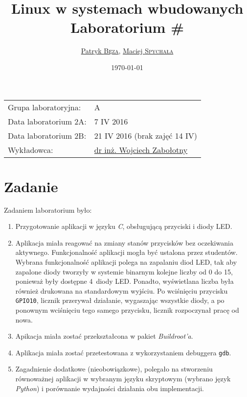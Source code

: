 \documentclass{article}
\title{Linux w systemach wbudowanych\\Laboratorium \#\labnumber}
\author{\href{mailto:bezap@student.mini.pw.edu.pl}{Patryk \textsc{Bęza}}, \href{mailto:spychalam@student.mini.pw.edu.pl}{Maciej \textsc{Spychała}}}
\date{\today}
\newcommand{\labnumber}{2}
\begin{document}
\maketitle

\begin{center}
\begin{tabular}{ll}
Grupa laboratoryjna: & A\\
Data laboratorium \labnumber A: & 7 IV 2016\\
Data laboratorium \labnumber B: & 21 IV 2016 (brak zajęć 14 IV)\\
Wykładowca: & \href{mailto:wzab@ise.pw.edu.pl}{dr inż. Wojciech Zabołotny}
\end{tabular}
\end{center}



\section{Zadanie}
\label{task}

Zadaniem laboratorium było:
\begin{enumerate}
\item Przygotowanie aplikacji w języku \emph{C}, obsługującą przyciski i diody LED.
\item Aplikacja miała reagować na zmiany stanów przycisków bez oczekiwania aktywnego. Funkcjonalność aplikacji mogła być ustalona przez studentów. Wybrana funkcjonalność aplikacji polega na zapalaniu diod LED, tak aby zapalone diody tworzyły w systemie binarnym kolejne liczby od 0 do 15, ponieważ były dostępne 4~diody LED. Ponadto, wyświetlana liczba była również drukowana na standardowym wyjściu. Po wciśnięciu przycisku \texttt{GPIO10}, licznik przerywał działanie, wygaszając wszystkie diody, a po ponownym wciśnięciu tego samego przycisku, licznik rozpoczynał pracę od nowa.
\item Apikacja miała zostać przekształcona w pakiet \emph{Buildroot'a}.
\item Aplikacja miała zostać przetestowana z wykorzystaniem debuggera \texttt{gdb}.
\item Zagadnienie dodatkowe (nieobowiązkowe), polegało na stworzeniu równoważnej aplikacji w wybranym języku skryptowym (wybrano język \emph{Python}) i porównanie wydajności działania obu implementacji.
\end{enumerate}
\end{document}
